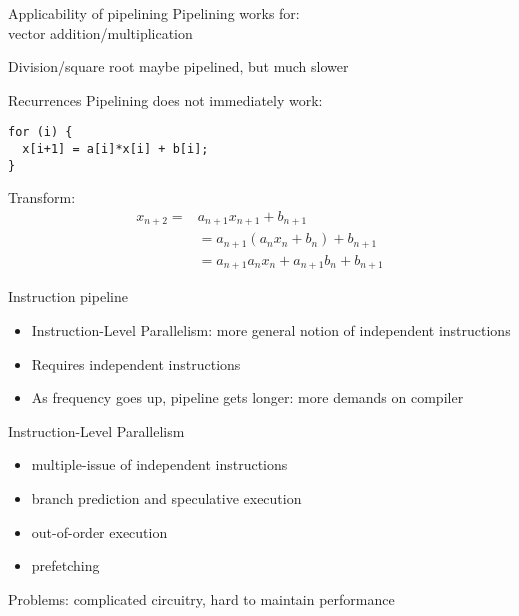 \begin{numberedframe}{Applicability of pipelining}
  Pipelining works for:\\
  vector addition/multiplication

  Division/square root maybe pipelined, but much slower
\end{numberedframe}

\begin{numberedframe}{Recurrences}
Pipelining does not immediately work:
\begin{verbatim}
for (i) {
  x[i+1] = a[i]*x[i] + b[i];
}
\end{verbatim}
Transform:
\[
\begin{array}{rl}
  x_{n+2}=&a_{n+1}x_{n+1}+b_{n+1}\\
    &=a_{n+1}(a_nx_n+b_n)+b_{n+1}\\
    &=a_{n+1}a_nx_n + a_{n+1}b_n+b_{n+1}
\end{array}
\]
\end{numberedframe}

\begin{numberedframe}{Instruction pipeline}
  \begin{itemize}
  \item Instruction-Level Parallelism: more general notion of 
    independent instructions
  \item Requires independent instructions
  \item As frequency goes up, pipeline gets longer: more demands on compiler
  \end{itemize}
\end{numberedframe}

\begin{numberedframe}{Instruction-Level Parallelism}
  \begin{itemize}
  \item multiple-issue of independent instructions
  \item branch prediction and speculative execution
  \item out-of-order execution
  \item prefetching
  \end{itemize}
  Problems: complicated circuitry, hard to maintain performance
\end{numberedframe}

